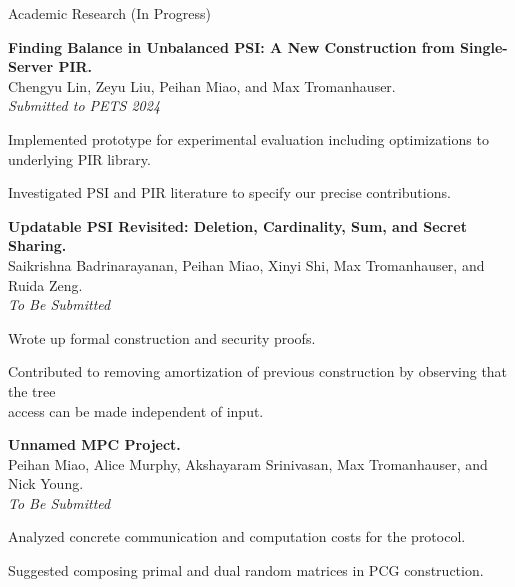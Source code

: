 \documentclass{resume} %
\begin{document}
\begin{grouping}{Academic Research \hfill (In Progress)}

\item {\bf Finding Balance in Unbalanced PSI: A New Construction from Single-Server PIR.} \\
    Chengyu Lin, Zeyu Liu, Peihan Miao, and Max Tromanhauser. \\
    {\em Submitted to PETS 2024}
    \begin{items}
        \item Implemented prototype for experimental evaluation including optimizations to underlying PIR library.
        \item Investigated PSI and PIR literature to specify our precise contributions.
    \end{items}

\item {\bf Updatable PSI Revisited: Deletion, Cardinality, Sum, and Secret Sharing. } \\
    Saikrishna Badrinarayanan, Peihan Miao, Xinyi Shi, Max Tromanhauser, and Ruida Zeng. \\
    {\em To Be Submitted} %
    \begin{items}
        \item Wrote up formal construction and security proofs.
        \item Contributed to removing amortization of previous construction by observing that the tree \\
            access can be made independent of input.
    \end{items}

\item {\bf \color{blue} Unnamed MPC Project.} \\
    Peihan Miao, Alice Murphy, Akshayaram Srinivasan, Max Tromanhauser, and Nick Young. \\
    {\em To Be Submitted} %
    \begin{items}
        \item Analyzed concrete communication and computation costs for the protocol.
        \item Suggested composing primal and dual random matrices in PCG construction.
    \end{items}

\end{grouping}

\end{document}
